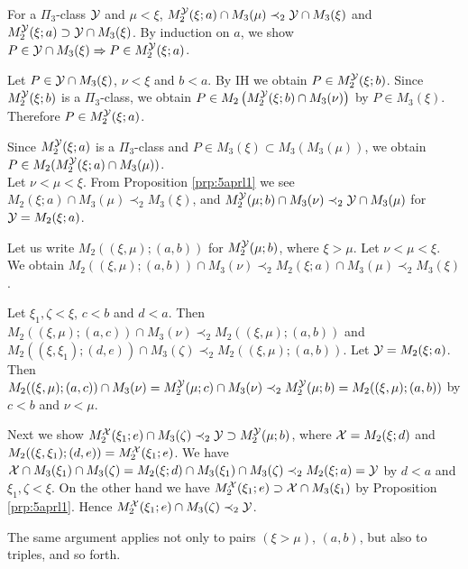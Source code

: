 \documentclass{article}
\begin{document}
\bprp
\label{prp:5aprl1}
For a $\Pi_{3}$-class ${\cal Y}$ and $\mu<\xi$,
$
M_{2}^{{\cal Y}}(\xi;a)\cap M_{3}(\mu) \prec_{2}
{\cal Y}\cap M_{3}(\xi)
$ and
$M_{2}^{{\cal Y}}(\xi;a)\supset
{\cal Y}\cap M_{3}(\xi)$.
\eprp
\bprf
By induction on $a$, we show
$P\in{\cal Y}\cap M_{3}(\xi) \Rightarrow 
P\in M_{2}^{{\cal Y}}(\xi;a)$.


Let $P\in{\cal Y}\cap M_{3}(\xi)$, $\nu<\xi$ and $b<a$.
By IH we obtain $P\in M_{2}^{{\cal Y}}(\xi;b)$. 
Since $M_{2}^{{\cal Y}}(\xi;b)$ is a $\Pi_{3}$-class, we obtain
$P\in M_{2}\left(M_{2}^{{\cal Y}}(\xi;b)\cap M_{3}(\nu)\right)$ by $P\in M_{3}(\xi)$.
Therefore $P\in M_{2}^{{\cal Y}}(\xi;a)$.

Since $M_{2}^{{\cal Y}}(\xi;a)$ is a $\Pi_{3}$-class and $P\in M_{3}(\xi)\subset M_{3}(M_{3}(\mu))$,
we obtain $P\in M_{2}(M_{2}^{{\cal Y}}(\xi;a)\cap M_{3}(\mu))$.
\eprf
\\

Let $\nu<\mu<\xi$. From Proposition \ref{prp:5aprl1} we see
$
M_{2}(\xi;a)\cap M_{3}(\mu) \prec_{2}M_{3}(\xi)
$, and 
$M_{2}^{{\cal Y}}(\mu;b)\cap M_{3}(\nu) \prec_{2} {\cal Y}\cap M_{3}(\mu)$ for ${\cal Y}=M_{2}(\xi;a)$.

Let us write $M_{2}((\xi,\mu);(a,b))$ for $M_{2}^{{\cal Y}}(\mu;b)$, where $\xi>\mu$.
Let $\nu<\mu<\xi$.
We obtain
$M_{2}((\xi,\mu);(a,b))\cap M_{3}(\nu) \prec_{2} M_{2}(\xi;a)\cap M_{3}(\mu)\prec_{2}M_{3}(\xi)$.

\bprp\label{prp:pi4pair}
Let $\xi_{1},\zeta<\xi$, $c<b$ and $d<a$. Then
$M_{2}((\xi,\mu);(a,c))\cap M_{3}(\nu)\prec_{2}M_{2}((\xi,\mu);(a,b))$ and
$M_{2}((\xi,\xi_{1});(d,e))\cap M_{3}(\zeta) \prec_{2} M_{2}((\xi,\mu);(a,b))$.
\eprp
\bprf
Let ${\cal Y}=M_{2}(\xi;a)$. Then
$M_{2}((\xi,\mu);(a,c))\cap M_{3}(\nu)=M_{2}^{{\cal Y}}(\mu;c)\cap M_{3}(\nu)\prec_{2}
M_{2}^{{\cal Y}}(\mu;b)=M_{2}((\xi,\mu);(a,b))$ by $c<b$ and $\nu<\mu$.

Next we show $M_{2}^{{\cal X}}(\xi_{1};e)\cap M_{3}(\zeta) \prec_{2}{\cal Y}\supset M_{2}^{{\cal Y}}(\mu;b)$,
where
${\cal X}=M_{2}(\xi;d)$ and $M_{2}((\xi,\xi_{1});(d,e))=M_{2}^{{\cal X}}(\xi_{1};e)$.
We have 
${\cal X}\cap M_{3}(\xi_{1})\cap M_{3}(\zeta)=M_{2}(\xi;d)\cap M_{3}(\xi_{1})\cap M_{3}(\zeta)\prec_{2}M_{2}(\xi;a)={\cal Y}$
by $d<a$ and $\xi_{1},\zeta<\xi$.
On the other hand we have
$M_{2}^{{\cal X}}(\xi_{1};e)\supset{\cal X}\cap M_{3}(\xi_{1})$
by Proposition \ref{prp:5aprl1}.
Hence $M_{2}^{{\cal X}}(\xi_{1};e)\cap M_{3}(\zeta) \prec_{2}{\cal Y}$.
\eprf




The same argument applies not only to pairs $(\xi>\mu)$, $(a,b)$, but also to
triples, and so forth.
\end{document}
